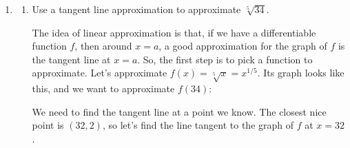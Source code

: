 \documentclass{article}
\theoremstyle{theorem}
\begin{document}
\begin{enumerate}
\begin{enumerate}
    \item
      \begin{problem}[\vfill\newpage]
        Find $\dfrac{d}{dx} \left( \dfrac{e^{x^2+x}}{\ln 3} \right)$
      \end{problem}

      \begin{solution}
        We'll apply the Chain Rule to differentiate the numerator, and realize that $\ln 3$ is a constant in the denominator:
       
          $$\dfrac{d}{dx}\left( \dfrac{e^{x^2+x}}{\ln 3}\right) = \frac{1}{\ln 3}\cdot e^{x^2+x}\cdot (2x+1) $$
          
        
      \end{solution}

  \end{enumerate}

\item {} \label{fall2015-1a-m2practice2-7} 

  \begin{enumerate}
  \item
    \begin{problem}[\vfill]
      Use a tangent line approximation to approximate $\sqrt[5]{34}$.
    \end{problem}

    \begin{solution}
      The idea of linear approximation is that, if we have a differentiable function $f$, then around $x = a$, a good approximation for the graph of $f$ is the tangent line at $x = a$. So, the first step is to pick a function to approximate. Let's approximate $f(x) = \sqrt[5]{x} = x^{1/5}$. Its graph looks like this, and we want to approximate $f(34)$:
      \begin{center}
      \end{center}
      We need to find the tangent line at a point we know. The closest nice point is $(32, 2)$, so let's find the line tangent to the graph of $f$ at $x = 32$. 


\end{solution}
\end{enumerate}
\end{enumerate}
\end{document}
